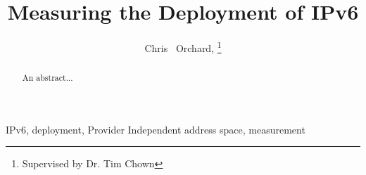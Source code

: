 \documentclass[final, technote, a4paper]{IEEEtran}
\begin{document}
\title{Measuring the Deployment of IPv6}

\author{Chris ~Orchard, \thanks{Supervised by Dr. Tim Chown}}


\maketitle

\begin{abstract}
An abstract...
\end{abstract}

\begin{IEEEkeywords}
IPv6, deployment, Provider Independent address space, measurement
\end{IEEEkeywords}









{}
\end{document}

